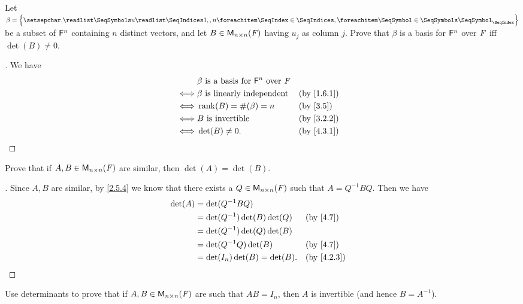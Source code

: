 \begin{ex}\label{ex:4.3.14}
  Let \(\beta = \set{\seq{u}{1,,n}}\) be a subset of \(\mathsf{F}^n\) containing \(n\) distinct vectors, and let \(B \in \mathsf{M}_{{n} \times n}({\mathit{F}})\) having \(u_j\) as column \(j\).
  Prove that \(\beta\) is a basis for \(\mathsf{F}^n\) over \(\mathit{F}\) iff \(\det(B) \neq 0\).
\end{ex}

\begin{proof}[]
  We have
  \begin{align*}
         & \beta \text{ is a basis for } \vs{F}^n \text{ over } \F                               \\
    \iff & \beta \text{ is linearly independent}                   &  & \text{(by \cref{1.6.1})} \\
    \iff & \rk{B} = \#(\beta) = n                                  &  & \text{(by \cref{3.5})}   \\
    \iff & B \text{ is invertible}                                 &  & \text{(by \cref{3.2.2})} \\
    \iff & \det(B) \neq 0.                                         &  & \text{(by \cref{4.3.1})}
  \end{align*}
\end{proof}

\begin{ex}\label{ex:4.3.15}
  Prove that if \(A, B \in \mathsf{M}_{{n} \times n}({\mathit{F}})\) are similar, then \(\det(A) = \det(B)\).
\end{ex}

\begin{proof}[]
  Since \(A, B\) are similar, by \cref{2.5.4} we know that there exists a \(Q \in \mathsf{M}_{{n} \times n}({\mathit{F}})\) such that \(A = Q^{-1} B Q\).
  Then we have
  \begin{align*}
    \det(A) & = \det(Q^{-1} B Q)                                           \\
            & = \det(Q^{-1}) \det(B) \det(Q) &  & \text{(by \cref{4.7})}   \\
            & = \det(Q^{-1}) \det(Q) \det(B)                               \\
            & = \det(Q^{-1} Q) \det(B)       &  & \text{(by \cref{4.7})}   \\
            & = \det(I_n) \det(B) = \det(B). &  & \text{(by \cref{4.2.3})}
  \end{align*}
\end{proof}

\begin{ex}\label{ex:4.3.16}
  Use determinants to prove that if \(A, B \in \mathsf{M}_{{n} \times n}({\mathit{F}})\) are such that \(AB = I_n\), then \(A\) is invertible
  (and hence \(B = A^{-1}\)).
\end{ex}

